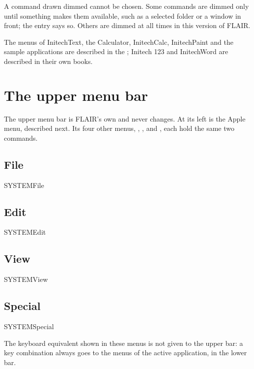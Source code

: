 A command drawn dimmed cannot be chosen.  Some commands are dimmed only
until something makes them available, such as a selected folder or a
window in front; the entry says so.  Others are dimmed at all times in this
version of FLAIR.

The menus of InitechText, the Calculator, InitechCalc, InitechPaint and the
sample applications are described in the ; Initech 123 and InitechWord are described in their own books.

\section{The upper menu bar}
The upper menu bar is FLAIR's own and never changes.  At its left is the
Apple menu, described next.  Its four other menus, ,
,  and , each hold the same
two commands.


\subsection{File}
\begin{MenuReference}{SYSTEM}{File}
\end{MenuReference}
\subsection{Edit}
\begin{MenuReference}{SYSTEM}{Edit}
\end{MenuReference}
\subsection{View}
\begin{MenuReference}{SYSTEM}{View}
\end{MenuReference}
\subsection{Special}
\begin{MenuReference}{SYSTEM}{Special}
\end{MenuReference}
The keyboard equivalent  shown in these menus is not given to
the upper bar: a  key combination always goes to the menus of
the active application, in the lower bar.

